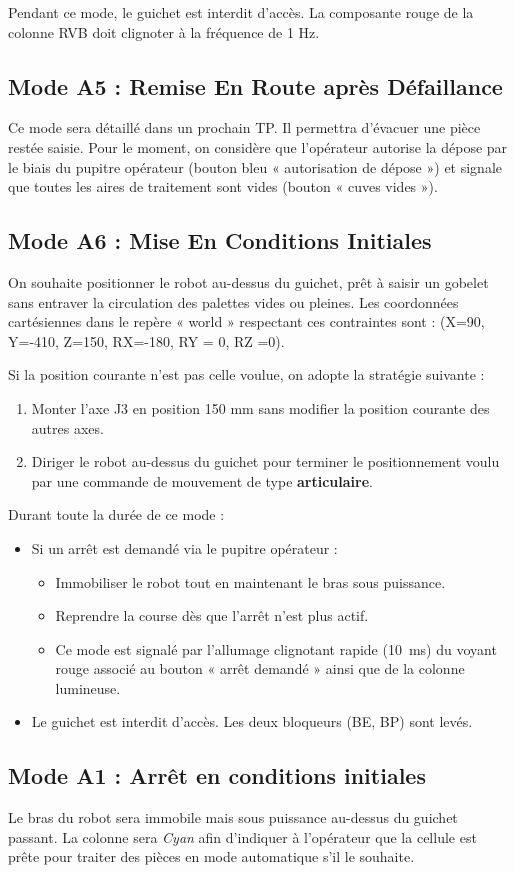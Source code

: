 Pendant ce mode, le guichet est interdit d'accès. La composante rouge de la colonne RVB doit clignoter à la fréquence de 1 Hz.

\subsection{Mode A5 : Remise En Route après Défaillance}

Ce mode sera détaillé dans un prochain TP. Il permettra d'évacuer une pièce restée saisie.
Pour le moment, on considère que l'opérateur autorise la dépose par le biais du pupitre opérateur (bouton bleu « autorisation de dépose ») et signale que toutes les aires de traitement sont vides (bouton « cuves vides »).

\subsection{Mode A6 : Mise En Conditions Initiales}

On souhaite positionner le robot au-dessus du guichet, prêt à saisir un gobelet sans entraver la circulation des palettes vides ou pleines.
Les coordonnées cartésiennes dans le repère « world » respectant ces contraintes sont : (X=90, Y=-410, Z=150, RX=-180, RY = 0, RZ =0).

Si la position courante n'est pas celle voulue, on adopte la stratégie suivante :
\begin{enumerate}
    \item Monter l'axe J3 en position 150 mm sans modifier la position courante des autres axes.
    \item Diriger le robot au-dessus du guichet pour terminer le positionnement voulu par une commande de mouvement de type \textbf{articulaire}.
\end{enumerate}
Durant toute la durée de ce mode : 
\begin{itemize}
    \item Si un arrêt est demandé via le pupitre opérateur : 
    \begin{itemize}
        \item Immobiliser le robot tout en maintenant le bras sous puissance.
        \item Reprendre la course dès que l'arrêt n'est plus actif.
        \item Ce mode est signalé par l'allumage clignotant rapide (\SI{10}{ms}) du voyant rouge associé au bouton « arrêt demandé » ainsi que de la colonne lumineuse.
    \end{itemize}
    \item Le guichet est interdit d'accès. Les deux bloqueurs (BE, BP) sont levés.
\end{itemize}

\subsection{Mode A1 : Arrêt en conditions initiales}
Le bras du robot sera immobile mais sous puissance au-dessus du guichet passant. La colonne sera \textit{Cyan} afin d'indiquer à l'opérateur que la cellule est prête pour traiter des pièces en mode automatique s'il le souhaite.
